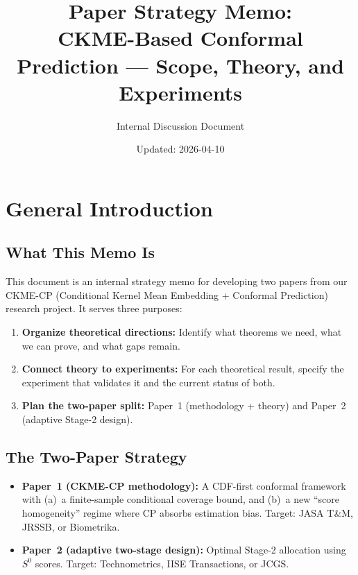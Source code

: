 \documentclass[11pt]{article}
\title{Paper Strategy Memo:\\CKME-Based Conformal Prediction --- Scope, Theory, and Experiments}
\author{Internal Discussion Document}
\date{Updated: 2026-04-10}
\begin{document}
\maketitle

\tableofcontents
\newpage

\section{General Introduction}
\label{sec:intro}

\subsection{What This Memo Is}

This document is an internal strategy memo for developing two papers
from our CKME-CP (Conditional Kernel Mean Embedding + Conformal
Prediction) research project. It serves three purposes:

\begin{enumerate}
  \item \textbf{Organize theoretical directions:} Identify what theorems
    we need, what we can prove, and what gaps remain.
  \item \textbf{Connect theory to experiments:} For each theoretical
    result, specify the experiment that validates it and the current
    status of both.
  \item \textbf{Plan the two-paper split:} Paper~1 (methodology +
    theory) and Paper~2 (adaptive Stage-2 design).
\end{enumerate}

\subsection{The Two-Paper Strategy}

\begin{itemize}
  \item \textbf{Paper~1 (CKME-CP methodology):} A CDF-first conformal
    framework with (a)~a finite-sample conditional coverage bound, and
    (b)~a new ``score homogeneity'' regime where CP absorbs estimation
    bias. Target: JASA T\&M, JRSSB, or Biometrika.
  \item \textbf{Paper~2 (adaptive two-stage design):} Optimal Stage-2
    allocation using $S^0$ scores. Target: Technometrics, IISE
    Transactions, or JCGS.
\end{itemize}
\end{document}
